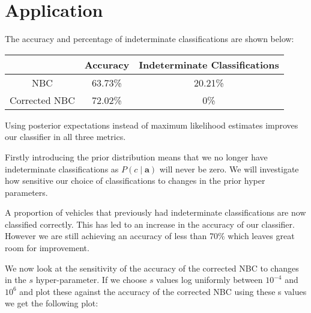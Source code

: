 \section{Application}

The accuracy and percentage of indeterminate classifications are shown below:
\begin{center}
	\begin{tabular}{ c|c c }
		              & Accuracy & Indeterminate Classifications\\
		\hline
		NBC           & 63.73\%  & 20.21\% \\
		Corrected NBC & 72.02\%  & 0\%
	\end{tabular}
\end{center}

Using posterior expectations instead of maximum likelihood estimates improves our classifier in all three metrics.

Firstly introducing the prior distribution means that we no longer have indeterminate classifications as $P(c \mid \mathbf{a})$ will never be zero.
We will investigate how sensitive our choice of classifications to changes in the prior hyper parameters.

A proportion of vehicles that previously had indeterminate classifications are now classified correctly.
This has led to an increase in the accuracy of our classifier.
However we are still achieving an accuracy of less than 70\% which leaves great room for improvement.

We now look at the sensitivity of the accuracy of the corrected NBC to changes in the $s$ hyper-parameter.
If we choose $s$ values log uniformly between $10^{-4}$ and $10^{6}$ and plot these against the accuracy of the corrected NBC using these s values we get the following plot:
\begin{center}
\end{center}

